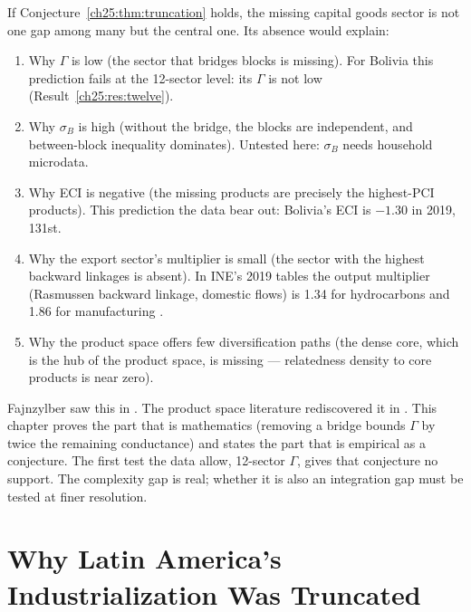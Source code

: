 \documentclass[../structural_economics_book.tex]{subfiles}
\begin{document}
\begin{keyinsight}
If Conjecture~\ref{ch25:thm:truncation} holds, the missing capital goods sector is not one gap among many but the central one. Its absence would explain:
\begin{enumerate}
\item Why $\Gamma$ is low (the sector that bridges blocks is missing). For Bolivia this prediction fails at the 12-sector level: its $\Gamma$ is not low (Result~\ref{ch25:res:twelve}).
\item Why $\sigma_B$ is high (without the bridge, the blocks are independent, and between-block inequality dominates). Untested here: $\sigma_B$ needs household microdata.
\item Why ECI is negative (the missing products are precisely the highest-PCI products). This prediction the data bear out: Bolivia's ECI is $-1.30$ in 2019, 131st.
\item Why the export sector's multiplier is small (the sector with the highest backward linkages is absent). In INE's 2019 tables the output multiplier (Rasmussen backward linkage, domestic flows) is 1.34 for hydrocarbons and 1.86 for manufacturing \citep{ine2026sut}.
\item Why the product space offers few diversification paths (the dense core, which is the hub of the product space, is missing --- relatedness density to core products is near zero).
\end{enumerate}

Fajnzylber saw this in \citeyear{fajnzylber1983industrializacion}. The product space literature rediscovered it in \citeyear{hidalgo2007product}. This chapter proves the part that is mathematics (removing a bridge bounds $\Gamma$ by twice the remaining conductance) and states the part that is empirical as a conjecture. The first test the data allow, 12-sector $\Gamma$, gives that conjecture no support. The complexity gap is real; whether it is also an integration gap must be tested at finer resolution.
\end{keyinsight}


\section{Why Latin America's Industrialization Was Truncated}
\label{ch25:sec:why_truncated}
\end{document}
